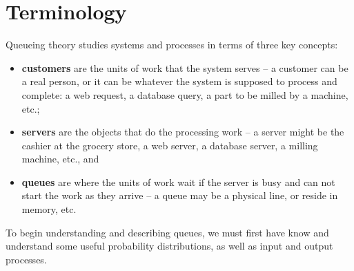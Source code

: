 \section{Terminology}
Queueing theory studies systems and processes in terms of three key concepts:
\begin{itemize}[noitemsep]
\item \textbf{customers} are the units of work that the system serves -- a customer can be a real person, or it can be whatever the system is supposed to process and complete: a web request, a database query, a part to be milled by a machine, etc.;
\item \textbf{servers} are the objects that do the processing work -- a server might be the cashier at the grocery store, a web server, a database server, a milling machine, etc., and 
\item \textbf{queues} are where the units of work wait if the server is busy and can not start the work as they arrive -- a queue may be a physical line, or reside in memory, etc. 
\end{itemize}
To begin understanding and describing queues, we must first have know and understand some useful probability distributions, as well as input and output processes.
